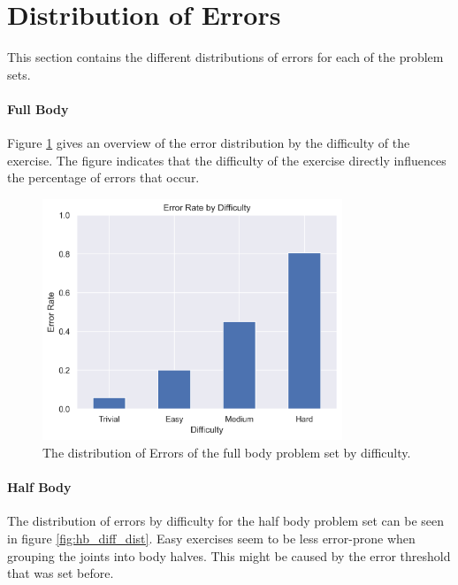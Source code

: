 \section{Distribution of Errors}

This section contains the different distributions of errors for each of the problem sets.

\paragraph{Full Body}

Figure \ref{fig:fb_diff_dist} gives an overview of the error distribution by the difficulty of the exercise. The figure indicates that the difficulty of the exercise directly influences the percentage of errors that occur.

\begin{figure}[ht]
  \centering
  \includegraphics[width=0.8\textwidth]{figures/Data/dist_full_body/Error_Rate_by_Difficulty.png}
  \caption[Error Distribution of the Full Body by difficulty]{The distribution of Errors of the full body problem set by difficulty.}
  \label{fig:fb_diff_dist}
\end{figure}

\paragraph{Half Body}

The distribution of errors by difficulty for the half body problem set can be seen in figure \ref{fig:hb_diff_dist}. Easy exercises seem to be less error-prone when grouping the joints into body halves. This might be caused by the error threshold that was set before.

